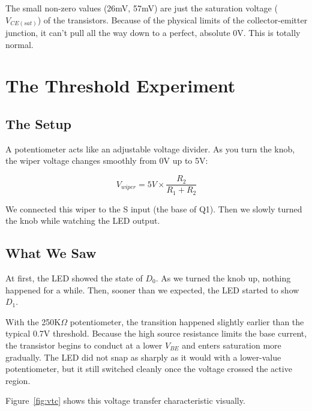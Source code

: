 \documentclass[11pt,a4paper]{article}
\begin{document}
The small non-zero values (26mV, 57mV) are just the saturation voltage ($V_{CE(sat)}$) of the transistors. Because of the physical limits of the collector-emitter junction, it can't pull all the way down to a perfect, absolute 0V. This is totally normal.

\section{The Threshold Experiment}

\subsection{The Setup}

A potentiometer acts like an adjustable voltage divider. As you turn the knob, the wiper voltage changes smoothly from 0V up to 5V:

\begin{equation}
V_{wiper} = 5V \times \frac{R_2}{R_1 + R_2}
\end{equation}

We connected this wiper to the S input (the base of Q1). Then we slowly turned the knob while watching the LED output.

\subsection{What We Saw}

At first, the LED showed the state of $D_0$. As we turned the knob up, nothing happened for a while. Then, sooner than we expected, the LED started to show $D_1$.

With the 250K$\Omega$ potentiometer, the transition happened slightly earlier than the typical 0.7V threshold. Because the high source resistance limits the base current, the transistor begins to conduct at a lower $V_{BE}$ and enters saturation more gradually. The LED did not snap as sharply as it would with a lower-value potentiometer, but it still switched cleanly once the voltage crossed the active region.

Figure~\ref{fig:vtc} shows this voltage transfer characteristic visually.
\end{document}
